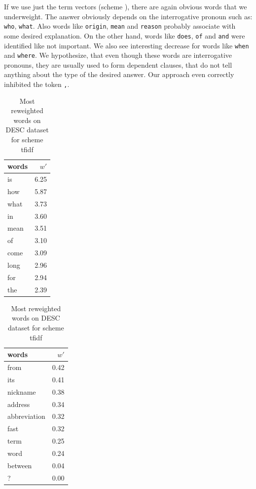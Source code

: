     If we use just the term vectors (scheme ), there are again obvious words that we underweight.
    The answer obviously depends on the interrogative pronoun such as: \texttt{who}, \texttt{what}.
    Also words like \texttt{origin}, \texttt{mean} and \texttt{reason} probably associate with some desired explanation.
    On the other hand, words like \texttt{does}, \texttt{of} and \texttt{and} were identified like not important.
    We also see interesting decrease for words like \texttt{when} and \texttt{where}.
    We hypothesize, that even though these words are interrogative pronouns, they are usually used to form dependent clauses, that do not tell anything about the type of the desired answer.
    Our approach even correctly inhibited the token \texttt{,}.
 

\begin{table}[h]
    \centering
    \begin{minipage}{.4\linewidth}
      \centering
        \begin{tabular}{lr}
\toprule
words &  $w'$ \\
\midrule
   is &  6.25 \\
  how &  5.87 \\
 what &  3.73 \\
   in &  3.60 \\
 mean &  3.51 \\
   of &  3.10 \\
 come &  3.09 \\
 long &  2.96 \\
  for &  2.94 \\
  the &  2.39 \\
\bottomrule
\end{tabular}

    \end{minipage}
    \begin{minipage}{.4\linewidth}
      \centering
        \begin{tabular}{lr}
\toprule
        words &  $w'$ \\
\midrule
         from &  0.42 \\
          its &  0.41 \\
     nickname &  0.38 \\
      address &  0.34 \\
 abbreviation &  0.32 \\
         fast &  0.32 \\
         term &  0.25 \\
         word &  0.24 \\
      between &  0.04 \\
            ? &  0.00 \\
\bottomrule
\end{tabular}

    \end{minipage} 
    \caption{Most reweighted words on DESC dataset for scheme tfidf}
    \label{tab:words:trec:tfidf}
\end{table}

